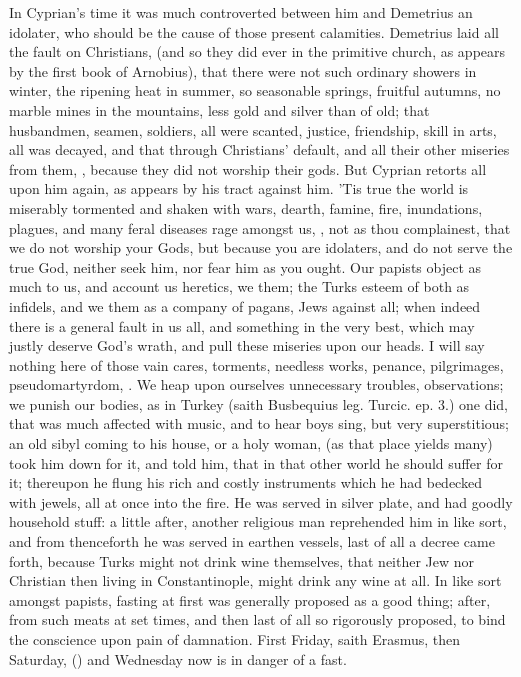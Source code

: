 {In Cyprian's time it was much controverted between him and Demetrius an
idolater, who should be the cause of those present calamities.
Demetrius laid all the fault on Christians, (and so they did ever in
the primitive church, as appears by the first book of Arnobius),
that there were not such ordinary showers in winter, the ripening
heat in summer, so seasonable springs, fruitful autumns, no marble
mines in the mountains, less gold and silver than of old; that
husbandmen, seamen, soldiers, all were scanted, justice, friendship,
skill in arts, all was decayed, and that through Christians' default,
and all their other miseries from them, , because they did not worship their gods. But Cyprian retorts
all upon him again, as appears by his tract against him. 'Tis true the
world is miserably tormented and shaken with wars, dearth, famine,
fire, inundations, plagues, and many feral diseases rage amongst us,
, not as thou complainest, that we do not worship your Gods,
but because you are idolaters, and do not serve the true God, neither
seek him, nor fear him as you ought. Our papists object as much to us,
and account us heretics, we them; the Turks esteem of both as infidels,
and we them as a company of pagans, Jews against all; when indeed there
is a general fault in us all, and something in the very best, which may
justly deserve God's wrath, and pull these miseries upon our heads. I
will say nothing here of those vain cares, torments, needless works,
penance, pilgrimages, pseudomartyrdom, \etc{}. We heap upon ourselves
unnecessary troubles, observations; we punish our bodies, as in Turkey
(saith Busbequius \textlatin{leg. Turcic. ep. 3.}) one did, that was much
affected with music, and to hear boys sing, but very superstitious; an
old sibyl coming to his house, or a holy woman, (as that place yields
many) took him down for it, and told him, that in that other world he
should suffer for it; thereupon he flung his rich and costly
instruments which he had bedecked with jewels, all at once into the
fire. He was served in silver plate, and had goodly household stuff: a
little after, another religious man reprehended him in like sort, and
from thenceforth he was served in earthen vessels, last of all a decree
came forth, because Turks might not drink wine themselves, that neither
Jew nor Christian then living in Constantinople, might drink any wine
at all. In like sort amongst papists, fasting at first was generally
proposed as a good thing; after, from such meats at set times, and then
last of all so rigorously proposed, to bind the conscience upon pain
of damnation. First Friday, saith Erasmus, then Saturday, () and Wednesday now is in danger of a fast.

}
